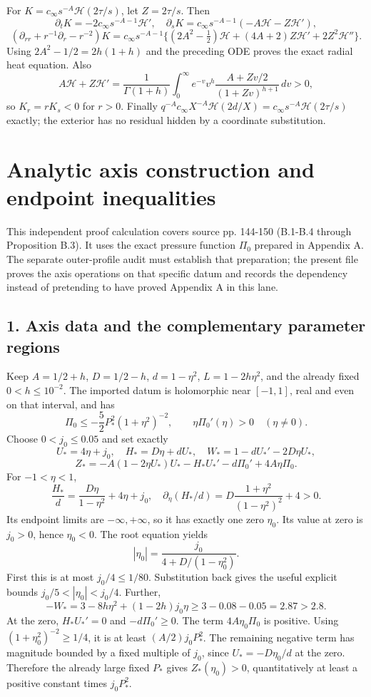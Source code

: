 \documentclass[10pt,a4paper]{article}
\begin{document}
For \(K=c_\infty s^{-A}\mathcal H(2\tau/s)\), let \(Z=2\tau/s\). Then
\[
\partial_tK=-2c_\infty s^{-A-1}\mathcal H',\quad
\partial_sK=c_\infty s^{-A-1}(-A\mathcal H-Z\mathcal H'),
\]
\[
(\partial_{rr}+r^{-1}\partial_r-r^{-2})K
=c_\infty s^{-A-1}\{(2A^2-\tfrac12)\mathcal H
+(4A+2)Z\mathcal H'+2Z^2\mathcal H''\}.
\]
Using \(2A^2-1/2=2h(1+h)\) and the preceding ODE proves the exact radial heat equation. Also
\[
A\mathcal H+Z\mathcal H'
=\frac1{\Gamma(1+h)}\int_0^\infty e^{-v}v^h
\frac{A+Zv/2}{(1+Zv)^{h+1}}\,dv>0,
\]
so \(K_r=rK_s<0\) for \(r>0\). Finally
\(q^{-A}c_\infty X^{-A}\mathcal H(2d/X)=c_\infty s^{-A}\mathcal H(2\tau/s)\) exactly; the exterior has no residual hidden by a coordinate substitution.


\section{Analytic axis construction and endpoint inequalities}

This independent proof calculation covers source pp. 144-150 (B.1-B.4 through Proposition B.3). It uses the exact pressure function \(\Pi_0\) prepared in Appendix A. The separate outer-profile audit must establish that preparation; the present file proves the axis operations on that specific datum and records the dependency instead of pretending to have proved Appendix A in this lane.

\subsection{1. Axis data and the complementary parameter regions}

Keep \(A=1/2+h\), \(D=1/2-h\), \(d=1-\eta^2\), \(L=1-2h\eta^2\), and the already fixed \(0<h\le10^{-2}\). The imported datum is holomorphic near \([-1,1]\), real and even on that interval, and has
\[
\Pi_0\le-\frac52P_*^2(1+\eta^2)^{-2},\qquad
\eta\Pi_0'(\eta)>0\quad(\eta\ne0).
\]
Choose \(0<j_0\le0.05\) and set exactly
\[
U_*=4\eta+j_0,\quad H_*=D\eta+dU_*,
\quad W_*=1-dU_*'-2D\eta U_*,
\]
\[
Z_*=-A(1-2\eta U_*)U_*-H_*U_*'-d\Pi_0'+4A\eta\Pi_0.
\]
For \(-1<\eta<1\),
\[
\frac{H_*}{d}=\frac{D\eta}{1-\eta^2}+4\eta+j_0,
\quad \partial_\eta(H_*/d)
=D\frac{1+\eta^2}{(1-\eta^2)^2}+4>0.
\]
Its endpoint limits are \(-\infty,+\infty\), so it has exactly one zero \(\eta_0\). Its value at zero is \(j_0>0\), hence \(\eta_0<0\). The root equation yields
\[
|\eta_0|=\frac{j_0}{4+D/(1-\eta_0^2)}.
\]
First this is at most \(j_0/4\le1/80\). Substitution back gives the useful explicit bounds \(j_0/5<|\eta_0|<j_0/4\). Further,
\[
-W_*=3-8h\eta^2+(1-2h)j_0\eta
\ge3-0.08-0.05=2.87>2.8.
\]
At the zero, \(H_*U_*'=0\) and \(-d\Pi_0'\ge0\). The term \(4A\eta_0\Pi_0\) is positive. Using \((1+\eta_0^2)^{-2}\ge1/4\), it is at least \((A/2)j_0P_*^2\). The remaining negative term has magnitude bounded by a fixed multiple of \(j_0\), since \(U_*=-D\eta_0/d\) at the zero. Therefore the already large fixed \(P_*\) gives \(Z_*(\eta_0)>0\), quantitatively at least a positive constant times \(j_0P_*^2\).
\end{document}
